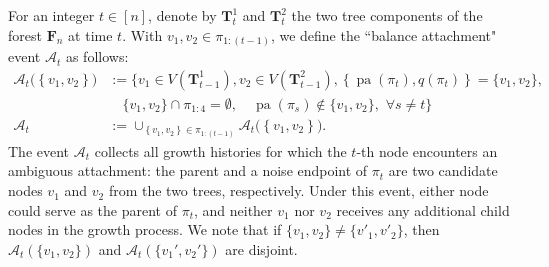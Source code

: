 \documentclass[twoside,11pt]{article}
\theoremstyle{remark}
\begin{document}
For an integer $t \in [n]$, denote by $\boldsymbol{T}^1_t$ and $\boldsymbol{T}^2_t$ the two tree components of the forest $\boldsymbol{F}_{n}$ at time $t$.
With $v_1, v_2 \in \pi_{1:(t-1)}$, 
we define the ``balance attachment" event $\mathcal{A}_t$ as follows:
%
\begin{align}
\nonumber
\mathcal{A}_t\bigl(\left\{v_1, v_2\right\}\bigr)& := \bigl\{ v_1 \in V(\bm{T}_{t-1}^1), v_2 \in V(\bm{T}_{t-1}^2),  \left\{\operatorname{pa}(\pi_t), q(\pi_t)\right\}=\{v_1, v_2\}, \\
\nonumber
&\quad \{v_1,v_2\}\cap\pi_{1:4}=\emptyset,\quad\operatorname{pa}(\pi_s) \notin \{v_1, v_2\},\,\, \forall s \neq t \bigr\} \\
\label{eqn: balance attachment}
\mathcal{A}_t &:= \cup_{\left\{v_1, v_2\right\} \in \pi_{1:(t-1)}} \mathcal{A}_t\bigl(\left\{v_1, v_2\right\}\bigr). 
\end{align}
%
The event $\mathcal{A}_t$ collects all growth histories for which the $t$-th node encounters an ambiguous attachment: the parent and a noise endpoint of $\pi_t$ are two candidate nodes $v_1$ and $v_2$ from the two trees, respectively. Under this event, either node could serve as the parent of $\pi_t$, and neither $v_1$ nor $v_2$ receives any additional child nodes in the growth process. We note that if $\{v_1, v_2\} \neq \{v'_1, v'_2\}$, then $\mathcal{A}_t(\{v_1, v_2\})$ and $\mathcal{A}_t(\{v_1', v_2'\})$ are disjoint. 
\end{document}
